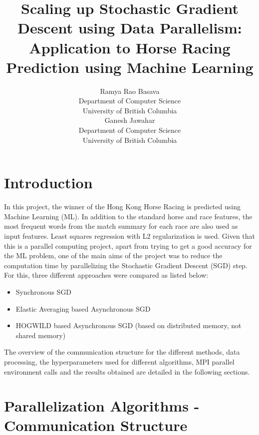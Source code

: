 \documentclass[12pt]{article}
\title{Scaling up Stochastic Gradient Descent using Data Parallelism:\\
Application to Horse Racing Prediction using Machine Learning}
\author{
  Ramya Rao Basava \\
  Department of Computer Science \\
  University of British Columbia 
  \\\And
  Ganesh Jawahar \\
  Department of Computer Science \\
  University of British Columbia 
}
\date{}
\begin{document}
\maketitle

\section{Introduction}
In this project, the winner of the Hong Kong Horse Racing is predicted using Machine Learning (ML). In addition to the standard horse and race features, the most frequent words from the match summary for each race are also used as input features. Least squares regression with L2 regularization is used. Given that this is a parallel computing project, apart from trying to get a good accuracy for the ML problem, one of the main aims of the project was to reduce the computation time by parallelizing the Stochastic Gradient Descent (SGD) step. For this, three different approaches were compared as listed below: 

\begin{itemize}[noitemsep, nosep]
 \item Synchronous SGD
 \item Elastic Averaging based Asynchronous SGD
 \item HOGWILD based Asynchronous SGD (based on distributed memory, not shared memory)
\end{itemize}

The overview of the communication structure for the different methods, data processing, the hyperparameters used for different algorithms, MPI parallel environment calls and the results obtained are detailed in the following sections.

\section{Parallelization Algorithms - Communication Structure}
\label{sec:palgs}
\end{document}
